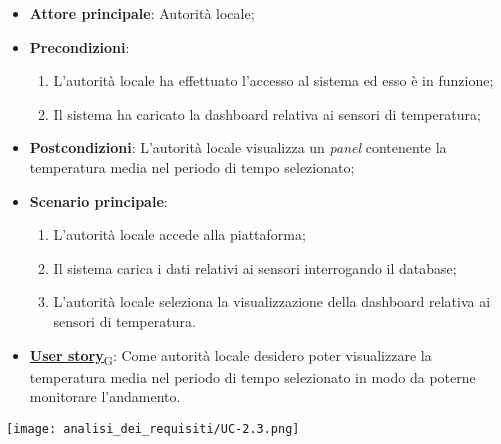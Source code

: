 \begin{itemize}
	\item \textbf{Attore principale}: Autorità locale;
	\item \textbf{Precondizioni}:
	      \begin{enumerate}
		      \item L'autorità locale ha effettuato l'accesso al sistema ed esso è in funzione;
		      \item Il sistema ha caricato la dashboard relativa ai sensori di temperatura;
	      \end{enumerate}
	\item \textbf{Postcondizioni}: L'autorità locale visualizza un \textit{panel} contenente la temperatura media nel periodo di tempo selezionato;
	\item \textbf{Scenario principale}:
	      \begin{enumerate}
		      \item L'autorità locale accede alla piattaforma;
		      \item Il sistema carica i dati relativi ai sensori interrogando il database;
		      \item L'autorità locale seleziona la visualizzazione della dashboard relativa ai sensori di temperatura.
	      \end{enumerate}
	\item \href{https://7last.github.io/docs/rtb/documentazione-interna/glossario\#user-story}{\textbf{User story}\textsubscript{G}}: Come autorità locale desidero poter visualizzare la temperatura media nel periodo di tempo selezionato
	      in modo da poterne monitorare l'andamento.
\end{itemize}
\begin{center}
	\texttt{[image: analisi\_dei\_requisiti/UC-2.3.png]}
\end{center}

